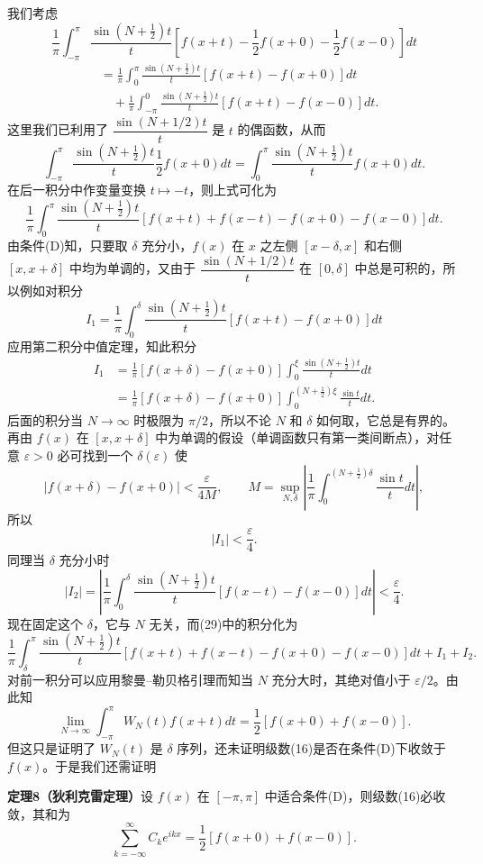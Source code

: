 我们考虑
\[
 \frac1\pi\int_{-\pi}^{\pi}\frac{\sin(N+\frac12)t}{t}
 \left[f(x+t)-\frac12f(x+0)-\frac12f(x-0)\right]dt
\]
\[
 \begin{aligned}
 &=\frac1\pi\int_0^{\pi}\frac{\sin(N+\frac12)t}{t}[f(x+t)-f(x+0)]dt\\
 &\quad+\frac1\pi\int_{-\pi}^{0}\frac{\sin(N+\frac12)t}{t}[f(x+t)-f(x-0)]dt.
 \end{aligned}
\]
这里我们已利用了 $\dfrac{\sin(N+1/2)t}{t}$ 是 $t$ 的偶函数，从而
\[
 \int_{-\pi}^{\pi}\frac{\sin(N+\frac12)t}{t}\frac12f(x+0)dt
 =\int_0^{\pi}\frac{\sin(N+\frac12)t}{t}f(x+0)dt.
\]
在后一积分中作变量变换 $t\mapsto-t$，则上式可化为
\begin{equation}
 \frac1\pi\int_0^{\pi}\frac{\sin(N+\frac12)t}{t}
 [f(x+t)+f(x-t)-f(x+0)-f(x-0)]dt.
 \tag{29}
\end{equation}
由条件(D)知，只要取 $\delta$ 充分小，$f(x)$ 在 $x$ 之左侧 $[x-\delta,x]$ 和右侧 $[x,x+\delta]$ 中均为单调的，又由于 $\dfrac{\sin(N+1/2)t}{t}$ 在 $[0,\delta]$ 中总是可积的，所以例如对积分
\[
 I_1=\frac1\pi\int_0^{\delta}\frac{\sin(N+\frac12)t}{t}[f(x+t)-f(x+0)]dt
\]
应用第二积分中值定理，知此积分
\[
 \begin{aligned}
 I_1&=\frac1\pi[f(x+\delta)-f(x+0)]\int_0^{\xi}\frac{\sin(N+\frac12)t}{t}dt\\
 &=\frac1\pi[f(x+\delta)-f(x+0)]\int_0^{(N+\frac12)\xi}\frac{\sin t}{t}dt.
 \end{aligned}
\]
后面的积分当 $N\to\infty$ 时极限为 $\pi/2$，所以不论 $N$ 和 $\delta$ 如何取，它总是有界的。再由 $f(x)$ 在 $[x,x+\delta]$ 中为单调的假设（单调函数只有第一类间断点），对任意 $\varepsilon>0$ 必可找到一个 $\delta(\varepsilon)$ 使
\[
 |f(x+\delta)-f(x+0)|<\frac{\varepsilon}{4M},
 \qquad
 M=\sup_{N,\delta}\left|\frac1\pi\int_0^{(N+\frac12)\delta}\frac{\sin t}{t}dt\right|,
\]
所以
\[
 |I_1|<\frac\varepsilon4.
\]
同理当 $\delta$ 充分小时
\[
 |I_2|=\left|\frac1\pi\int_0^{\delta}\frac{\sin(N+\frac12)t}{t}[f(x-t)-f(x-0)]dt\right|<\frac\varepsilon4.
\]
现在固定这个 $\delta$，它与 $N$ 无关，而(29)中的积分化为
\[
 \frac1\pi\int_{\delta}^{\pi}\frac{\sin(N+\frac12)t}{t}
 [f(x+t)+f(x-t)-f(x+0)-f(x-0)]dt+I_1+I_2.
\]
对前一积分可以应用黎曼--勒贝格引理而知当 $N$ 充分大时，其绝对值小于 $\varepsilon/2$。由此知
\[
 \lim_{N\to\infty}\int_{-\pi}^{\pi}W_N(t)f(x+t)dt
 =\frac12[f(x+0)+f(x-0)].
\]
但这只是证明了 $W_N(t)$ 是 $\delta$ 序列，还未证明级数(16)是否在条件(D)下收敛于 $f(x)$。于是我们还需证明

\noindent\textbf{定理8（狄利克雷定理）}\quad 设 $f(x)$ 在 $[-\pi,\pi]$ 中适合条件(D)，则级数(16)必收敛，其和为
\begin{equation}
 \sum_{k=-\infty}^{\infty}C_ke^{ikx}=\frac12[f(x+0)+f(x-0)].
 \tag{30}
\end{equation}

